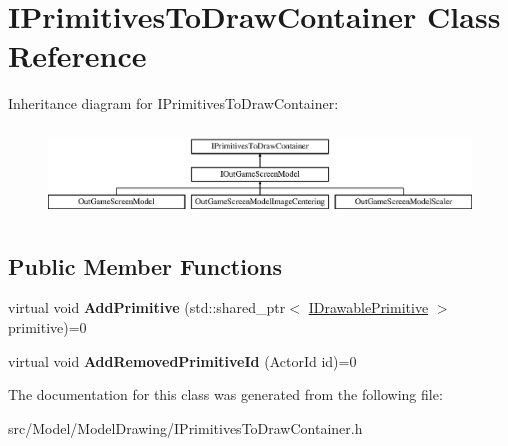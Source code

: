 \hypertarget{classIPrimitivesToDrawContainer}{}\section{I\+Primitives\+To\+Draw\+Container Class Reference}
\label{classIPrimitivesToDrawContainer}
Inheritance diagram for I\+Primitives\+To\+Draw\+Container\+:\begin{figure}[H]
\begin{center}
\leavevmode
\includegraphics[height=2.372881cm]{classIPrimitivesToDrawContainer}
\end{center}
\end{figure}
\subsection*{Public Member Functions}
\begin{DoxyCompactItemize}
\item 
virtual void {\bfseries Add\+Primitive} (std\+::shared\+\_\+ptr$<$ \hyperlink{classIDrawablePrimitive}{I\+Drawable\+Primitive} $>$ primitive)=0\hypertarget{classIPrimitivesToDrawContainer_ae4584c2e91df67b618a76aedd20ab0c5}{}\label{classIPrimitivesToDrawContainer_ae4584c2e91df67b618a76aedd20ab0c5}

\item 
virtual void {\bfseries Add\+Removed\+Primitive\+Id} (Actor\+Id id)=0\hypertarget{classIPrimitivesToDrawContainer_a3e4ee0c08e767e8a4a0adb65e2dbc0ca}{}\label{classIPrimitivesToDrawContainer_a3e4ee0c08e767e8a4a0adb65e2dbc0ca}

\end{DoxyCompactItemize}


The documentation for this class was generated from the following file\+:\begin{DoxyCompactItemize}
\item 
src/\+Model/\+Model\+Drawing/I\+Primitives\+To\+Draw\+Container.\+h\end{DoxyCompactItemize}
